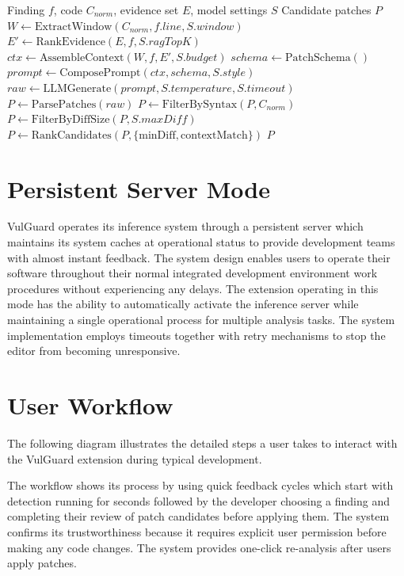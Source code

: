 \begin{algorithm}[htbp]
\caption{RAG-LLM Patch Synthesis}
\begin{algorithmic}[1]
\Require Finding $f$, code $C_{norm}$, evidence set $E$, model settings $S$
\Ensure Candidate patches $P$
\State $W \leftarrow \text{ExtractWindow}(C_{norm}, f.line, S.window)$
\State $E' \leftarrow \text{RankEvidence}(E, f, S.ragTopK)$
\State $ctx \leftarrow \text{AssembleContext}(W, f, E', S.budget)$
\State $schema \leftarrow \text{PatchSchema}()$
\State $prompt \leftarrow \text{ComposePrompt}(ctx, schema, S.style)$
\State $raw \leftarrow \text{LLMGenerate}(prompt, S.temperature, S.timeout)$
\State $P \leftarrow \text{ParsePatches}(raw)$
\State $P \leftarrow \text{FilterBySyntax}(P, C_{norm})$
\State $P \leftarrow \text{FilterByDiffSize}(P, S.maxDiff)$
\State $P \leftarrow \text{RankCandidates}(P, \{\text{minDiff}, \text{contextMatch}\})$
\State \Return $P$
\end{algorithmic}
\end{algorithm}

\section{Persistent Server Mode}
VulGuard operates its inference system through a persistent server which maintains its system caches at operational status to provide development teams with almost instant feedback. The system design enables users to operate their software throughout their normal integrated development environment work procedures without experiencing any delays. The extension operating in this mode has the ability to automatically activate the inference server while maintaining a single operational process for multiple analysis tasks. The system implementation employs timeouts together with retry mechanisms to stop the editor from becoming unresponsive.
\clearpage
\section{User Workflow}
The following diagram illustrates the detailed steps a user takes to interact with the VulGuard extension during typical development.

The workflow shows its process by using quick feedback cycles which start with detection running for seconds followed by the developer choosing a finding and completing their review of patch candidates before applying them. The system confirms its trustworthiness because it requires explicit user permission before making any code changes. The system provides one-click re-analysis after users apply patches.

